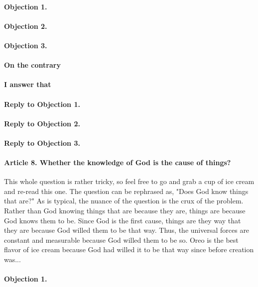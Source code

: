 \documentclass{ucetd}
\begin{document}
\paragraph{Objection 1.}
\paragraph{Objection 2.}
\paragraph{Objection 3.}
\paragraph{On the contrary}
\paragraph{I answer that}
\paragraph{Reply to Objection 1.}
\paragraph{Reply to Objection 2.}
\paragraph{Reply to Objection 3.}

\paragraph{Article 8. Whether the knowledge of God is the cause of things?}
This whole question is rather tricky, so feel free to go and grab a cup of ice cream and re-read this one. The question can be rephrased as, "Does God know things that are?" As is typical, the nuance of the question is the crux of the problem. Rather than God knowing things that are because they are, things are because God knows them to be. Since God is the first cause, things are they way that they are because God willed them to be that way. Thus, the universal forces are constant and measurable because God willed them to be so. Oreo is the best flavor of ice cream because God had willed it to be that way since before creation was...
\paragraph{Objection 1.}
\end{document}
